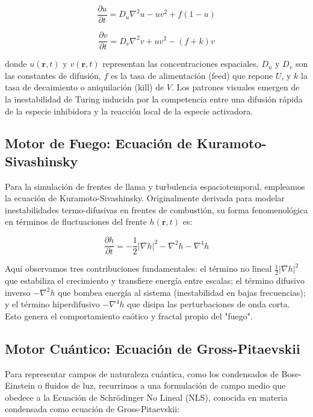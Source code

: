 \documentclass[12pt, openany]{book}
\begin{document}
\begin{equation}
\frac{\partial u}{\partial t} = D_u \nabla^2 u - u v^2 + f(1 - u)
\end{equation}

\begin{equation}
\frac{\partial v}{\partial t} = D_v \nabla^2 v + u v^2 - (f + k)v
\end{equation}

donde $u(\mathbf{r},t)$ y $v(\mathbf{r},t)$ representan las concentraciones espaciales. $D_u$ y $D_v$ son las constantes de difusión, $f$ es la tasa de alimentación (feed) que repone $U$, y $k$ la tasa de decaimiento o aniquilación (kill) de $V$. Los patrones visuales emergen de la inestabilidad de Turing inducida por la competencia entre una difusión rápida de la especie inhibidora y la reacción local de la especie activadora.

\subsection{Motor de Fuego: Ecuación de Kuramoto-Sivashinsky}
Para la simulación de frentes de llama y turbulencia espaciotemporal, empleamos la ecuación de Kuramoto-Sivashinsky. Originalmente derivada para modelar inestabilidades termo-difusivas en frentes de combustión, su forma fenomenológica en términos de fluctuaciones del frente $h(\mathbf{r},t)$ es:

\begin{equation}
\frac{\partial h}{\partial t} = -\frac{1}{2} |\nabla h|^2 - \nabla^2 h - \nabla^4 h
\end{equation}

Aquí observamos tres contribuciones fundamentales: el término no lineal $\frac{1}{2} |\nabla h|^2$ que estabiliza el crecimiento y transfiere energía entre escalas; el término difusivo inverso $-\nabla^2 h$ que bombea energía al sistema (inestabilidad en bajas frecuencias); y el término hiperdifusivo $-\nabla^4 h$ que disipa las perturbaciones de onda corta. Esto genera el comportamiento caótico y fractal propio del "fuego".

\subsection{Motor Cuántico: Ecuación de Gross-Pitaevskii}
Para representar campos de naturaleza cuántica, como los condensados de Bose-Einstein o fluidos de luz, recurrimos a una formulación de campo medio que obedece a la Ecuación de Schrödinger No Lineal (NLS), conocida en materia condensada como ecuación de Gross-Pitaevskii:
\end{document}
